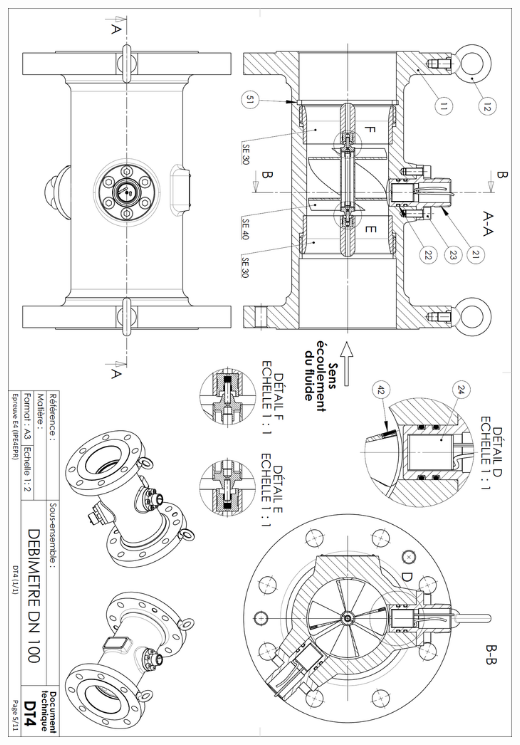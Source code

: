 \documentclass[10pt,fleqn]{article} %
\begin{document}
\begin{center}
\includegraphics[width=\textwidth]{images/debitmetre_06}
\end{center}
\end{document}
